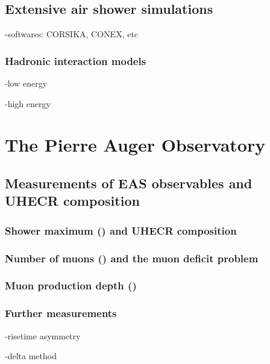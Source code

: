 \subsection{Extensive air shower simulations}
\label{sec:shower:simulations}

-softwares: CORSIKA, CONEX, etc

\subsubsection{Hadronic interaction models}

-low energy

-high energy


\section{The Pierre Auger Observatory}


\subsection{Measurements of EAS observables and UHECR composition}
\label{sec:shower:observables}


\subsubsection{Shower maximum (\xmax) and UHECR composition}

\subsubsection{Number of muons (\nmu) and the muon deficit problem}

\subsubsection{Muon production depth (\xmumax)}

\subsubsection{Further measurements}

-risetime asymmetry

-delta method






